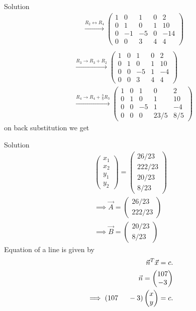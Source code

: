 \documentclass{beamer}
\numberwithin{equation}{section}
\providecommand{\brak}[1]{\ensuremath{\left(#1\right)}}
\theoremstyle{remark}
\newcommand{\myvec}[1]{\ensuremath{\begin{pmatrix}#1\end{pmatrix}}}
\begin{document}
\begin{frame}{Solution}
\begin{align}    
 &\xrightarrow{R_2 \leftrightarrow R_4} \left(\begin{array}{cccc|c}
        1 & 0 & 1 & 0 & 2\\
        0 & 1 & 0 & 1 & 10\\
        0 & -1 & -5 & 0 & -14\\
        0 & 0 & 3 & 4 & 4
\end{array}\right)\\
\end{align}
\begin{align}
&\xrightarrow{R_3 \rightarrow R_3+R_2} \left(\begin{array}{cccc|c}
        1 & 0 & 1 & 0 & 2\\
        0 & 1 & 0 & 1 & 10\\
        0 & 0 & -5 & 1 & -4\\
        0 & 0 & 3 & 4 & 4
\end{array}\right)\\
&\xrightarrow{R_4 \rightarrow R_4+\frac{3}{5}R_3} \left(\begin{array}{cccc|c}
        1 & 0 & 1 & 0 & 2\\
        0 & 1 & 0 & 1 & 10\\
        0 & 0 & -5 & 1 & -4\\
        0 & 0 & 0 & 23/5 & 8/5
\end{array}\right)
\end{align}
on back substitution we get
\end{frame}

\begin{frame}{Solution}
    \begin{align}
   \myvec{x_1\\x_2\\y_1\\y_2}=\myvec{26/23\\222/23\\20/23\\8/23}\\
  \implies \Vec{A}=\myvec{26/23\\ 222/23}\\
\implies   \Vec{B}=\myvec{20/23 \\ 8/23}
\end{align}
Equation of a line is given by
\begin{align}
    \Vec{n}^T\Vec{x}=c.\\
    \Vec{n}=\myvec{107\\-3}\\
    \implies \brak{107\hspace{0.5cm}-3}\myvec{x\\y}=c.
\end{align}
 \end{frame}
\end{document}
